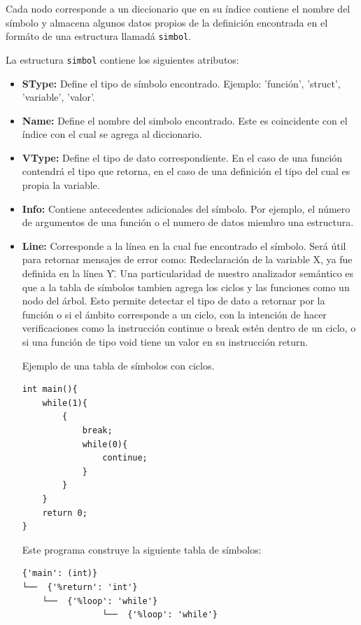 \documentclass[12pt]{article}
\begin{document}
Cada nodo corresponde a un diccionario que en su \'indice contiene el nombre del s\'imbolo y almacena algunos datos propios de la definici\'on encontrada en el form\'ato de una estructura llamad\'a \texttt{simbol}. 

La estructura \texttt{simbol} contiene los siguientes atributos:

\begin{itemize}
    \item  \textbf{SType:} Define el tipo de s\'imbolo encontrado. Ejemplo: 'funci\'on', 'struct', 'variable', 'valor'.
    \item  \textbf{Name:} Define el nombre del simbolo encontrado. Este es coincidente con el \'indice con el cual se agrega al diccionario.
    \item  \textbf{VType:} Define el tipo de dato correspondiente. En el caso de una funci\'on contendr\'a el tipo que retorna, en el caso de una definici\'on el tipo del cual es propia la variable. 
    \item  \textbf{Info:} Contiene antecedentes adicionales del s\'imbolo. Por ejemplo, el n\'umero de argumentos de una funci\'on o el numero de datos miembro una estructura. 
    \item  \textbf{Line:} Corresponde a la l\'inea en la cual fue encontrado el s\'imbolo. Ser\'a \'util para retornar mensajes de error como: \"Redeclaraci\'on de la variable X, ya fue definida en la l\'inea Y\". 
\clearpage
Una particularidad de nuestro analizador sem\'antico es que a la tabla de s\'imbolos tambien agrega los ciclos y las funciones como un nodo del \'arbol. Esto permite detectar el tipo de dato a retornar por la funci\'on o si el \'ambito corresponde a un ciclo, con la intenci\'on de hacer verificaciones como la instrucci\'on continue o break est\'en dentro de un ciclo, o si una funci\'on de tipo void tiene un valor en su instrucci\'on return.

Ejemplo de una tabla de s\'imbolos con ciclos.

\begin{verbatim}
int main(){
    while(1){
        {
            break;
            while(0){
                continue;
            }
        }
    }
    return 0;
}
\end{verbatim}

Este programa construye la siguiente tabla de s\'imbolos:
\begin{verbatim}
{'main': (int)}
└──  {'%return': 'int'}
    └──  {'%loop': 'while'}
                └──  {'%loop': 'while'}
\end{verbatim}


\end{itemize}
\end{document}
